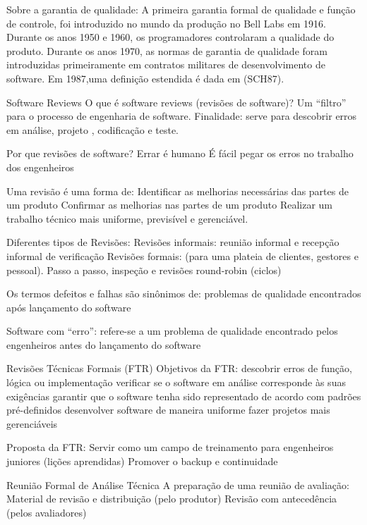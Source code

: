 \documentclass[12pt]{article}
\begin{document}
        Sobre a garantia de qualidade: 
            A primeira garantia formal de qualidade e função de controle, foi introduzido no mundo da produção no Bell Labs em 1916. 
            Durante os anos 1950 e 1960, os programadores controlaram a qualidade do produto. 
            Durante os anos 1970, as normas de garantia de qualidade foram introduzidas primeiramente em contratos militares de desenvolvimento de software. 
            Em 1987,uma definição estendida é dada em (SCH87). 

        Software Reviews 
            O que é software reviews (revisões de software)? Um “filtro” para o processo de engenharia de software. 
            Finalidade: serve para descobrir erros em análise, projeto , codificação e teste. 

        Por que revisões de software? 
            Errar é humano 
            É fácil pegar os erros no trabalho dos engenheiros 

        Uma revisão é uma forma de: 
            Identificar as melhorias necessárias das partes de um produto 
            Confirmar as melhorias nas partes de um produto
            Realizar um trabalho técnico mais uniforme, previsível e gerenciável. 

        Diferentes tipos de Revisões: 
            Revisões informais: reunião informal e recepção informal de verificação 
            Revisões formais: (para uma plateia de clientes, gestores e pessoal). Passo a passo, inspeção e revisões round-robin (ciclos) 

        Os termos defeitos e falhas são sinônimos de: problemas de qualidade encontrados após lançamento do software 

        Software com “erro”: refere-se a um problema de qualidade encontrado pelos engenheiros antes do lançamento do software 

        Revisões Técnicas Formais (FTR) 
        Objetivos da FTR: 
            descobrir erros de função, lógica ou implementação 
            verificar se o software em análise corresponde às suas exigências 
            garantir que o software tenha sido representado de acordo com padrões pré-definidos 
            desenvolver software de maneira uniforme 
            fazer projetos mais gerenciáveis 

        Proposta da FTR: 
            Servir como um campo de treinamento para engenheiros juniores (lições aprendidas) 
            Promover o backup e continuidade 

        Reunião Formal de Análise Técnica 
            A preparação de uma reunião de avaliação: 
            Material de revisão e distribuição (pelo produtor) 
            Revisão com antecedência (pelos avaliadores) 
\end{document}
